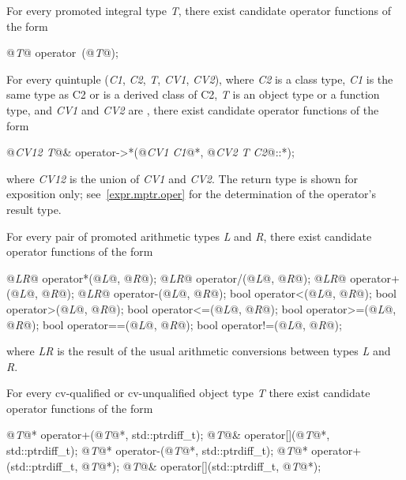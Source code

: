 \pnum
For every promoted integral type
\textit{T},
there exist candidate operator functions of the form

\begin{codeblock}
@\textit{T}@ operator~(@\textit{T}@);
\end{codeblock}

\pnum
For every quintuple
(\textit{C1},
\textit{C2},
\textit{T},
\textit{CV1},
\textit{CV2}),
where
\textit{C2}
is a class type,
\textit{C1}
is the same type as C2 or is a derived class of C2,
\textit{T}
is an object type or a function type,
and
\textit{CV1}
and
\textit{CV2}
are
,
there exist candidate operator functions of the form

\begin{codeblock}
@\textit{CV12 T}@& operator->*(@\textit{CV1 C1}@*, @\textit{CV2 T C2}@::*);
\end{codeblock}

where
\textit{CV12}
is the union of
\textit{CV1}
and
\textit{CV2}.
The return type is shown for exposition only; see~\ref{expr.mptr.oper} for the
determination of the operator's result type.

\pnum
For every pair of promoted arithmetic types
\textit{L}
and
\textit{R},
there exist candidate operator functions of the form

\begin{codeblock}
@\textit{LR}@      operator*(@\textit{L}@, @\textit{R}@);
@\textit{LR}@      operator/(@\textit{L}@, @\textit{R}@);
@\textit{LR}@      operator+(@\textit{L}@, @\textit{R}@);
@\textit{LR}@      operator-(@\textit{L}@, @\textit{R}@);
bool    operator<(@\textit{L}@, @\textit{R}@);
bool    operator>(@\textit{L}@, @\textit{R}@);
bool    operator<=(@\textit{L}@, @\textit{R}@);
bool    operator>=(@\textit{L}@, @\textit{R}@);
bool    operator==(@\textit{L}@, @\textit{R}@);
bool    operator!=(@\textit{L}@, @\textit{R}@);
\end{codeblock}

where
\textit{LR}
is the result of the usual arithmetic conversions between types
\textit{L}
and
\textit{R}.

\pnum
For every cv-qualified or cv-unqualified object type
\textit{T}
there exist candidate operator functions of the form

\begin{codeblock}
@\textit{T}@*      operator+(@\textit{T}@*, std::ptrdiff_t);
@\textit{T}@&      operator[](@\textit{T}@*, std::ptrdiff_t);
@\textit{T}@*      operator-(@\textit{T}@*, std::ptrdiff_t);
@\textit{T}@*      operator+(std::ptrdiff_t, @\textit{T}@*);
@\textit{T}@&      operator[](std::ptrdiff_t, @\textit{T}@*);
\end{codeblock}

